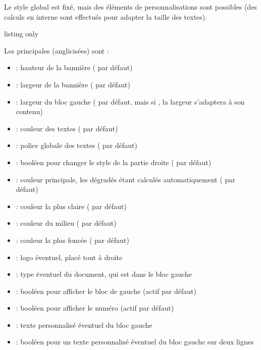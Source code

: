 \documentclass[french,11pt,a4paper]{article}
\begin{document}
Le style global est fixé, mais des éléments de personnalisations sont possibles (des calculs en interne sont effectués pour adapter la taille des textes).

\begin{DemoCode}{listing only}
\end{DemoCode}

\begin{DemoCode}{}
\end{DemoCode}

Les principales  (anglicisées) sont :

\begin{itemize}
	\item {} : hauteur de la bannière (\MontreCode{2.5em} par défaut)
	\item {} : largeur de la bannière ( par défaut)
	\item {} : largeur du bloc gauche (\MontreCode{2.75em} par défaut, mais si , la largeur s'adaptera à son contenu)
	\item {} : couleur des textes ( par défaut)
	\item {} : police globale des textes ( par défaut)
	\item {} : booléen pour changer le style de la partie droite ( par défaut)
	\item {} : couleur principale, les dégradés étant calculés automatiquement ( par défaut)
	\item {} : couleur la plus claire ( par défaut)
	\item {} : couleur du milieu ( par défaut)
	\item {} : couleur la plus foncée ( par défaut)
	\item {} : logo éventuel, placé tout à droite
	\item {} : type éventuel du document, qui est dans le bloc gauche
	\item {} : booléen pour afficher le bloc de gauche (actif par défaut)
	\item {} : booléen pour afficher le numéro (actif par défaut)
	\item {} : texte personnalisé éventuel du bloc gauche
	\item {} : booléen pour un texte personnalisé éventuel du bloc gauche sur deux lignes
\end{itemize}
\end{document}
